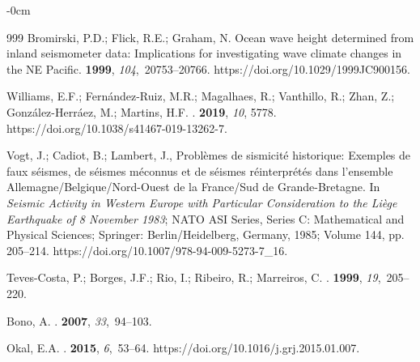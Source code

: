 \documentclass[sensors,article,accept,moreauthors,pdftex]{Definitions/mdpi}
\begin{document}
\begin{adjustwidth}{-\extralength}{0cm}
\begin{thebibliography}{999}
Bromirski, P.D.; Flick, R.E.; Graham, N.
\newblock Ocean wave height determined from inland seismometer data:
  Implications for investigating wave climate changes in the NE Pacific.
 {\bf 1999}, {\em
  104},~20753--20766.
\newblock
{https://doi.org/10.1029/1999JC900156}.

Williams, E.F.; Fernández-Ruiz, M.R.; Magalhaes, R.; Vanthillo, R.; Zhan, Z.;
  González-Herráez, M.; Martins, H.F.
.
 {\bf 2019}, {\em 10}, 5778. %
\newblock
{https://doi.org/10.1038/s41467-019-13262-7}.

Vogt, J.; Cadiot, B.; Lambert, J., Problèmes de sismicité historique:
  Exemples de faux séismes, de séismes méconnus et de séismes
  réinterprétés dans l'ensemble Allemagne/Belgique/Nord-Ouest de la
  France/Sud de Grande-Bretagne.
\newblock In {\em Seismic Activity in Western Europe with Particular
  Consideration to the Liège Earthquake of 8 November 1983}; NATO ASI Series, Series C: Mathematical and Physical
  Sciences; Springer: Berlin/Heidelberg, Germany, %
  1985;
  Volume 144, pp. 205--214.
\newblock
{https://doi.org/10.1007/978-94-009-5273-7\_16}.

Teves-Costa, P.; Borges, J.F.; Rio, I.; Ribeiro, R.; Marreiros, C.
.
 {\bf 1999}, {\em 19},~205--220.

Bono, A.
.
 {\bf 2007}, {\em 33},~94--103.

Okal, E.A.
.
 {\bf 2015}, {\em 6},~53--64.
\linebreak
{https://doi.org/10.1016/j.grj.2015.01.007}.


\end{thebibliography}
\end{adjustwidth}
\end{document}
